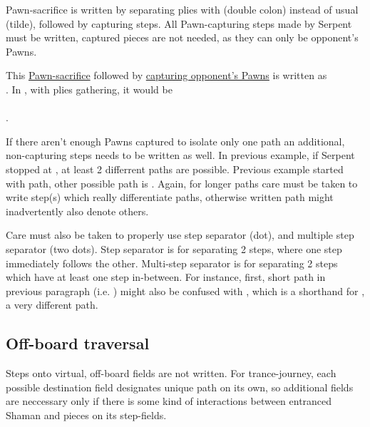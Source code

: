 Pawn-sacrifice is written by separating plies with \alg{::} (double colon) instead of usual \alg{\~{}} (tilde),
followed by capturing steps. All Pawn-capturing steps made by Serpent must be written, captured pieces are not
needed, as they can only be opponent's Pawns.

This \hyperref[fig:scn_tr_21_pawn_sacrifice_init]{Pawn-sacrifice} followed by
\hyperref[fig:scn_tr_22_pawn_sacrifice_end]{capturing opponent's Pawns} is written as \\
. In , with plies gathering, it would be \\
\alg{[Sr14-m15]\~{}[Am15-m11]::}\\
\alg{[Sm15..m17*..m19*.l20*.m21*.n20*.o21*]}.

If there aren't enough Pawns captured to isolate only one path an additional, non-capturing steps needs to be
written as well. In previous example, if Serpent stopped at , at least 2 differrent paths are possible.
Previous example started with  path, other possible path is
. Again, for longer paths care must be taken to write step(s) which really
differentiate paths, otherwise written path might inadvertently also denote others.

Care must also be taken to properly use step separator  (dot), and multiple step separator  (two
dots). Step separator  is for separating 2 steps, where one step immediately follows the other. Multi-step
separator  is for separating 2 steps which have at least one step in-between. For instance, first, short
path in previous paragraph (i.e. ) might also be confused with
, which is a shorthand for , a very
different path.

\subsection*{Off-board traversal}
\label{sec:Appendix/Notation/Off-board traversal}

Steps onto virtual, off-board fields are not written. For trance-journey, each possible destination field designates
unique path on its own, so additional fields are neccessary only if there is some kind of interactions between
entranced Shaman and pieces on its step-fields.

